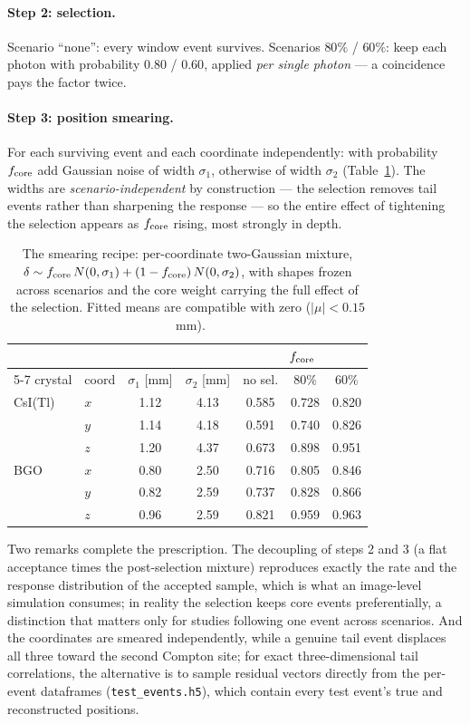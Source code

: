 \documentclass[11pt,a4paper]{article}
\newcommand{\code}[1]{\texttt{#1}}
\newcommand{\csitl}{CsI(Tl)}
\begin{document}
\paragraph{Step 2: selection.} Scenario ``none'': every window event
survives. Scenarios $80\%$ / $60\%$: keep each photon with probability
$0.80$ / $0.60$, applied \emph{per single photon} --- a coincidence pays the
factor twice.

\paragraph{Step 3: position smearing.} For each surviving event and each
coordinate independently: with probability $f_{\rm core}$ add Gaussian noise
of width $\sigma_1$, otherwise of width $\sigma_2$
(Table~\ref{tab:recipe}). The widths are \emph{scenario-independent} by
construction --- the selection removes tail events rather than sharpening the
response --- so the entire effect of tightening the selection appears as
$f_{\rm core}$ rising, most strongly in depth.

\begin{table}[htbp]
\centering
\begin{tabular}{llccccc}
  \toprule
  & & & & \multicolumn{3}{c}{$f_{\rm core}$} \\
  \cmidrule(lr){5-7}
  crystal & coord & $\sigma_1$ [mm] & $\sigma_2$ [mm] &
  no sel. & $80\%$ & $60\%$ \\
  \midrule
  \csitl{} & $x$ & 1.12 & 4.13 & 0.585 & 0.728 & 0.820 \\
           & $y$ & 1.14 & 4.18 & 0.591 & 0.740 & 0.826 \\
           & $z$ & 1.20 & 4.37 & 0.673 & 0.898 & 0.951 \\
  \midrule
  BGO      & $x$ & 0.80 & 2.50 & 0.716 & 0.805 & 0.846 \\
           & $y$ & 0.82 & 2.59 & 0.737 & 0.828 & 0.866 \\
           & $z$ & 0.96 & 2.59 & 0.821 & 0.959 & 0.963 \\
  \bottomrule
\end{tabular}
\caption{The smearing recipe: per-coordinate two-Gaussian mixture,
$\delta \sim f_{\rm core}\, N(0, \sigma_1) + (1 - f_{\rm core})\,
N(0, \sigma_2)$, with shapes frozen across scenarios and the core weight
carrying the full effect of the selection. Fitted means are compatible with
zero ($|\mu| < 0.15$~mm).}
\label{tab:recipe}
\end{table}

Two remarks complete the prescription. The decoupling of steps 2 and 3
(a flat acceptance times the post-selection mixture) reproduces exactly the
rate and the response distribution of the accepted sample, which is what an
image-level simulation consumes; in reality the selection keeps core events
preferentially, a distinction that matters only for studies following one
event across scenarios. And the coordinates are smeared independently, while
a genuine tail event displaces all three toward the second Compton site; for
exact three-dimensional tail correlations, the alternative is to sample
residual vectors directly from the per-event dataframes
(\code{test\_events.h5}), which contain every test event's true and
reconstructed positions.
\end{document}
